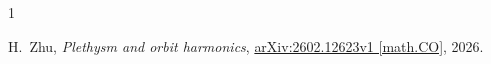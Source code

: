 \documentclass[11pt]{amsart}
\begin{document}
\begin{thebibliography}{1}

H.~Zhu,
\emph{Plethysm and orbit harmonics},
\href{https://arxiv.org/abs/2602.12623v1}{arXiv:2602.12623v1 [math.CO]},
2026.

\end{thebibliography}
\end{document}
